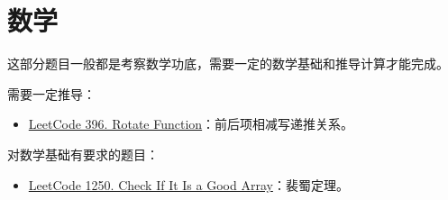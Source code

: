 \section{数学}

这部分题目一般都是考察数学功底，需要一定的数学基础和推导计算才能完成。

需要一定推导：
\begin{itemize}
  \item 
    \href{https://leetcode.com/problems/rotate-function/}{LeetCode 396. Rotate
      Function}：前后项相减写递推关系。
\end{itemize}

对数学基础有要求的题目：

\begin{itemize}
  \item
    \href{https://leetcode.com/problems/check-if-it-is-a-good-array/}{LeetCode
      1250. Check If It Is a Good Array}：裴蜀定理。
\end{itemize}

%

